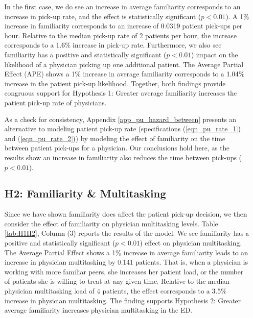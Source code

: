  In the first case, we do see an increase in average familiarity corresponds to an increase in pick-up rate, and the effect is statistically significant ($p < 0.01$). A 1\% increase in familiarity corresponds to an increase of 0.0319 patient pick-ups per hour. Relative to the median pick-up rate of 2 patients per hour, the increase corresponds to a 1.6\% increase in pick-up rate. Furthermore, we also see familiarity has a positive and statistically significant ($p < 0.01$) impact on the likelihood of a physician picking up one additional patient. The Average Partial Effect (APE) shows a 1\% increase in average familiarity corresponds to a 1.04\% increase in the patient pick-up likelihood. Together, both findings provide congruous support for Hypothesis 1: Greater average familiarity increases the patient pick-up rate of physicians.
 
 As a check for consistency, Appendix \ref{app_pu_hazard_between} presents an alternative to modeling patient pick-up rate (specifications (\ref{eqn_pu_rate_1}) and (\ref{eqn_pu_rate_2})) by modeling the effect of familiarity on the time between patient pick-ups for a physician. Our conclusions hold here, as the results show an increase in familiarity also reduces the time between pick-ups ($p < 0.01$).
 
 \subsection{H2: Familiarity \& Multitasking}
 Since we have shown familiarity does affect the patient pick-up decision, we then consider the effect of familiarity on physician multitasking levels. Table \ref{tab:H1H2}, Column (3) reports the results of the model. We see familiarity has a positive and statistically significant ($p < 0.01$) effect on physician multitasking. The Average Partial Effect shows a 1\% increase in average familiarity leads to an increase in physician multitasking by 0.141 patients. That is, when a physician is working with more familiar peers, she increases her patient load, or the number of patients she is willing to treat at any given time. Relative to the median physician multitasking load of 4 patients, the effect corresponds to a 3.5\% increase in physician multitasking. The finding supports Hypothesis 2: Greater average familiarity increases physician multitasking in the ED.
 
